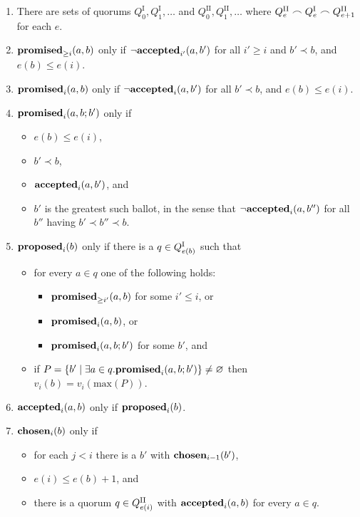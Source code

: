 \documentclass[journal]{IEEEtran}
\begin{document}
\begin{enumerate}

\item\label{paxos-quorums} There are sets of quorums $Q^\textrm{I}_0,
Q^\textrm{I}_1, \ldots$ and $Q^\textrm{II}_0, Q^\textrm{II}_1, \ldots$ where
${Q^\textrm{II}_e \frown Q^\textrm{I}_e \frown {Q}^\textrm{II}_{e+1}}$ for each $e$.

\item\label{paxos-mprom} $\mathbf{promised}_{\ge i}(a,b)$ only if $\neg\mathbf{accepted}_{i'}(a,b')$ for
all $i' \ge i$ and $b' \prec b$, and $e(b) \le e(i)$.

\item\label{paxos-fprom} $\mathbf{promised}_{i}(a,b)$ only if $\neg\mathbf{accepted}_{i}(a,b')$ for all
$b' \prec b$, and $e(b) \le e(i)$.

\item\label{paxos-bprom} $\mathbf{promised}_{i}(a,b;b')$ only if \begin{itemize} \item
$e(b) \le e(i)$, \item $b' \prec b$, \item $\mathbf{accepted}_{i}(a,b')$, and \item $b'$ is
the greatest such ballot, in the sense that $\neg \mathbf{accepted}_{i}(a,b'')$ for all
$b''$ having $b' \prec b'' \prec b$. \end{itemize}

\item\label{paxos-prop} $\mathbf{proposed}_{i}(b)$ only if there is a $q \in {Q}^\textrm{I}_{e(b)}$ such
that
\begin{itemize}
\item for every $a \in q$ one of the following holds:
%
\begin{itemize}
\item $\mathbf{promised}_{\ge i'}(a,b)$ for some $i' \le i$, or
\item $\mathbf{promised}_{i}(a,b)$, or
\item $\mathbf{promised}_{i}(a,b;b')$ for some $b'$, and
\end{itemize}

\item if $P = \{ b' \mid \exists a \in q. \mathbf{promised}_{i}(a,b;b') \} \ne
\varnothing$ then $v_i(b) = v_i(\mathrm{max}(P))$.

\end{itemize}

\item \label{paxos-acc} $\mathbf{accepted}_{i}(a,b)$ only if $\mathbf{proposed}_{i}(b)$.

\item \label{paxos-chosen} $\mathbf{chosen}_{i}(b)$ only if \begin{itemize} \item for
each $j < i$ there is a $b'$ with $\mathbf{chosen}_{i-1}(b')$, \item $e(i) \le e(b) +
1$, and \item there is a quorum $q \in {Q}^\textrm{II}_{e(i)}$ with $\mathbf{accepted}_{i}(a,b)$ for
every $a \in q$.  \end{itemize}

\end{enumerate}
\end{document}
